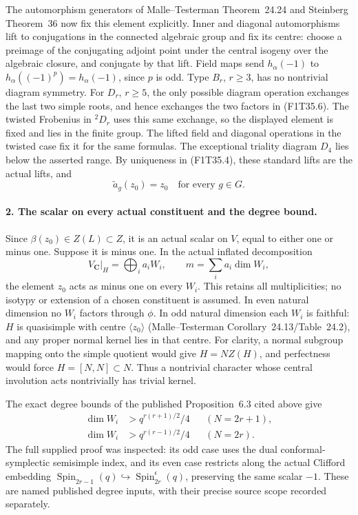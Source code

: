 The automorphism generators of Malle--Testerman
Theorem~24.24 and Steinberg Theorem~36 now fix
this element explicitly. Inner and diagonal
automorphisms lift to conjugations in the
connected algebraic group and fix its centre:
choose a preimage of the conjugating adjoint
point under the central isogeny over the
algebraic closure, and conjugate by that lift.
Field maps send \(h_\alpha(-1)\) to
\(h_\alpha((-1)^p)=h_\alpha(-1)\), since \(p\)
is odd. Type \(B_r\), \(r\ge3\), has no
nontrivial diagram symmetry. For \(D_r\),
\(r\ge5\), the only possible diagram operation
exchanges the last two simple roots, and hence
exchanges the two factors in (F1T35.6). The
twisted Frobenius in \({}^{2}D_r\) uses this same
exchange, so the displayed element is fixed and
lies in the finite group. The lifted field and
diagonal operations in the twisted case fix it
for the same formulas. The exceptional triality
diagram \(D_4\) lies below the asserted range.
By uniqueness in (F1T35.4), these standard lifts
are the actual lifts, and
\[
                    \widetilde a_g(z_0)=z_0
                         \quad\text{for every }g\in G.
 \tag{F1T35.7}
\]

\paragraph{2. The scalar on every actual constituent and the degree bound.}
Since \(\beta(z_0)\in Z(L)\subset Z\), it is an
actual scalar on \(V\), equal to either one or
minus one. Suppose it is minus one. In the actual
inflated decomposition
\[
              V_{\mathbf C}|_H=\bigoplus_i a_i W_i,
              \qquad m=\sum_i a_i\dim W_i,
 \tag{F1T35.8}
\]
the element \(z_0\) acts as minus one on every
\(W_i\). This retains all multiplicities; no
isotypy or extension of a chosen constituent is
assumed. In even natural dimension no \(W_i\)
factors through \(\phi\). In odd natural
dimension each \(W_i\) is faithful: \(H\) is
quasisimple with centre \(\langle z_0\rangle\)
(Malle--Testerman Corollary~24.13/Table~24.2),
and any proper normal kernel lies in that centre.
For clarity, a normal subgroup mapping onto the
simple quotient would give \(H=NZ(H)\), and
perfectness would force \(H=[N,N]\subset N\).
Thus a nontrivial character whose central
involution acts nontrivially has trivial kernel.

The exact degree bounds of the published
Proposition~6.3 cited above give
\[
 \begin{aligned}
 \dim W_i&>q^{r(r+1)/2}/4&& (N=2r+1),\\
 \dim W_i&>q^{r(r-1)/2}/4&& (N=2r).
 \end{aligned}
 \tag{F1T35.9}
\]
The full supplied proof was inspected: its odd
case uses the dual conformal-symplectic
semisimple index, and its even case restricts
along the actual Clifford embedding
\(\operatorname{Spin}_{2r-1}(q)\hookrightarrow
\operatorname{Spin}_{2r}^{\epsilon}(q)\), preserving
the same scalar \(-1\). These are named published
degree inputs, with their precise source scope
recorded separately.

